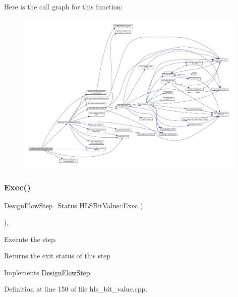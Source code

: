 Here is the call graph for this function\+:
\nopagebreak
\begin{figure}[H]
\begin{center}
\leavevmode
\includegraphics[width=350pt]{db/d75/classHLSBitValue_ab1fe55bc2b8b26bd131e9aed874f5e94_cgraph}
\end{center}
\end{figure}
\mbox{\label{classHLSBitValue_aa12a409aacf4e6eef2e5ab063923b572}} 
\subsubsection{\texorpdfstring{Exec()}{Exec()}}
{\footnotesize\ttfamily \hyperlink{design__flow__step_8hpp_afb1f0d73069c26076b8d31dbc8ebecdf}{Design\+Flow\+Step\+\_\+\+Status} H\+L\+S\+Bit\+Value\+::\+Exec (\begin{DoxyParamCaption}{ }\end{DoxyParamCaption})\hspace{0.3cm}{\ttfamily [override]}, {\ttfamily [virtual]}}



Execute the step. 

\begin{DoxyReturn}{Returns}
the exit status of this step 
\end{DoxyReturn}


Implements \hyperlink{classDesignFlowStep_a77d7e38493016766098711ea24f60b89}{Design\+Flow\+Step}.



Definition at line 150 of file hls\+\_\+bit\+\_\+value.\+cpp.




